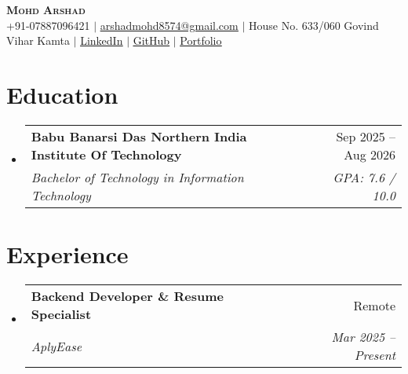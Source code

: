 \documentclass[letterpaper,9.8pt]{article}
\makeatletter
\newcommand{\resumeSubheading}[4]{
  \vspace{-1pt}\item
    \begin{tabular*}{0.97\textwidth}[t]{l@{\extracolsep{\fill}}r}
      \textbf{#1} & #2 \\
      \textit{\small#3} & \textit{\small #4} \\
    \end{tabular*}\vspace{-8pt}
}
\newcommand{\resumeSubHeadingListStart}{\begin{itemize}[leftmargin=0.1in, itemsep=3pt, label={}]}
\newcommand{\resumeSubHeadingListEnd}{\end{itemize}}
\makeatother
\begin{document}
\begin{center}
    \textbf{\Huge \scshape Mohd Arshad} \\ \vspace{2pt}
    \small
    +91-07887096421     $|$ \href{mailto:arshadmohd8574@gmail.com}{\underline{arshadmohd8574@gmail.com}}     $|$ House No. 633/060 Govind Vihar Kamta     $|$ \href{https://linkedin.com/in/https://www.linkedin.com/in/mohd-arshad-156227314}{\underline{LinkedIn}}     $|$ \href{https://github.com/https://github.com/MohdArshad-cell}{\underline{GitHub}}     $|$ \href{https://mohdarshad-cell.github.io/Portfolio-Website/}{\underline{Portfolio}}\end{center}

\section{Education}
  \resumeSubHeadingListStart
                    \resumeSubheading
          {Babu Banarsi Das Northern India Institute Of Technology}
          {Sep 2025 -- Aug 2026}
          {Bachelor of Technology in Information Technology}
          {GPA: 7.6 / 10.0}
              \resumeSubHeadingListEnd

\section{Experience}
  \resumeSubHeadingListStart
                \resumeSubheading
        { Backend Developer \& Resume Specialist}{Remote}
        {AplyEase}{Mar 2025 -- Present}
                    \resumeSubHeadingListEnd




\end{document}
